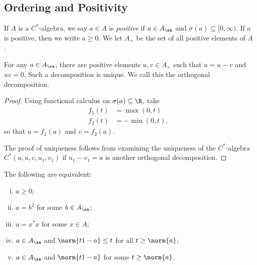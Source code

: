 \documentclass[10pt]{mypackage}
\begin{document}
\subsection{Ordering and Positivity}%
\begin{definition}
  If $A$ is a $C^{\ast}$-algebra, we say $a\in A$ is \textit{positive} if $a\in A_{\sa}$ and $\sigma\left( a \right)\subseteq [0,\infty)$. If $a$ is positive, then we write $a\geq 0$. We let $A_{+}$ be the set of all positive elements of $A$.
\end{definition}
\begin{theorem}
  For any $a\in A_{\sa}$, there are positive elements $u,v\in A_{+}$ such that $ a = u-v $ and $uv = 0$. Such a decomposition is unique. We call this the orthogonal decomposition.
\end{theorem}
\begin{proof}
  Using functional calculus on $\sigma(a)\subseteq \R$, take
  \begin{align*}
    f_1(t) &= \max\left( 0,t \right)\\
    f_2(t) &= -\min\left( 0,t \right),
  \end{align*}
  so that $u = f_1(a)$ and $v = f_2(a)$.

  The proof of uniqueness follows from examining the uniqueness of the $C^{\ast}$-algebra $C^{\ast}\left( a,u,v,u_1,v_1 \right)$ if $u_1-v_1 = a$ is another orthogonal decomposition.
\end{proof}
\begin{theorem}
  The following are equivalent:
  \begin{enumerate}[(i)]
    \item $a\geq 0$;
    \item $a = b^2$ for some $b\in A_{\sa}$;
    \item $a = x^{\ast}x$ for some $x\in A$;
    \item $a\in A_{\sa}$ and $\norm{t1-a}\leq t$ for all $t\geq \norm{a}$;
    \item $a\in A_{\sa}$ and $\norm{t1-a}$ for some $t\geq \norm{a}$.
  \end{enumerate}
\end{theorem}
\end{document}
